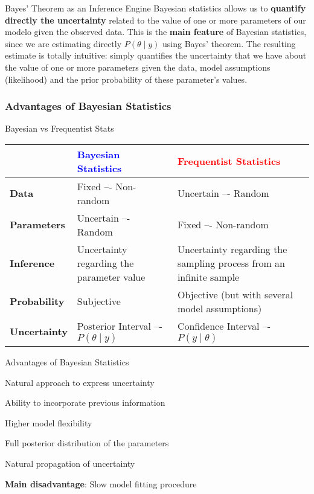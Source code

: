 \begin{frame}{Bayes' Theorem as an Inference Engine}
	Bayesian statistics allows us to \textbf{quantify directly the uncertainty}
	related to the value of one or more parameters of our modelo given the
	observed data.
	This is the \textbf{main feature} of Bayesian statistics,
	since we are estimating directly $P(\theta \mid y)$ using Bayes' theorem.
	The resulting estimate is totally intuitive:
	simply quantifies the uncertainty that we have about the value of one or more
	parameters given the data, model assumptions (likelihood) and the prior
	probability of these parameter's values.
\end{frame}

\subsubsection{Advantages of Bayesian Statistics}
\begin{frame}{Bayesian vs Frequentist Stats}
	\small
	\begin{tabular}{|l|p{}|p{}|}
		\toprule
		                     & \textcolor{blue}{\textbf{Bayesian Statistics}} & \textcolor{red}{\textbf{Frequentist Statistics}}                   \\ \midrule
		\textbf{Data}        & Fixed –- Non-random                            & Uncertain –- Random                                                \\ \midrule
		\textbf{Parameters}  & Uncertain –- Random                            & Fixed –- Non-random                                                \\ \midrule
		\textbf{Inference}   & Uncertainty regarding the parameter value      & Uncertainty regarding the sampling process from an infinite sample \\ \midrule
		\textbf{Probability} & Subjective                                     & Objective (but with several model assumptions)                     \\ \midrule
		\textbf{Uncertainty} & Posterior Interval –- $P(\theta \mid y)$       & Confidence Interval –- $P(y \mid \theta)$                          \\
		\bottomrule
	\end{tabular}
\end{frame}

\begin{frame}{Advantages of Bayesian Statistics}
	\begin{vfilleditems}
		\item Natural approach to express uncertainty
		\item Ability to incorporate previous information
		\item Higher model flexibility
		\item Full posterior distribution of the parameters
		\item Natural propagation of uncertainty
	\end{vfilleditems}
	\small \textbf{Main disadvantage}: Slow model fitting procedure
\end{frame}

